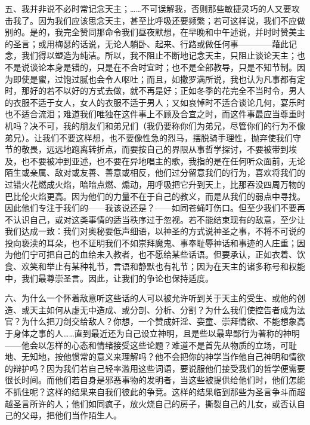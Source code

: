 五、我并非说不必时常记念天主；……不可误解我，否则那些敏捷灵巧的人又要攻击我了。因为我们应该思念天主，甚至比呼吸还要频繁；若可这样说，我们不应做别的。是的，我完全赞同那命令我们昼夜默想，在早晚和中午述说，并时时赞美主的圣言；或用梅瑟的话说，无论人躺卧、起来、行路或做任何事————藉此记念，我们得以塑造为纯洁。所以，我不阻止不断地记念天主，只阻止谈论天主；也不是说谈论本身是错的，只是在不合时宜时；也不是全部教导，只是不知节制。因为即使是蜜，过饱过腻也会令人呕吐；而且，如撒罗满所说，我也认为凡事都有定时，那好的若不以好的方式去做，就不再是好；正如冬季的花完全不当时令，男人的衣服不适于女人，女人的衣服不适于男人；又如哀悼时不适合谈论几何，宴乐时也不适合流泪；难道我们唯独在这件事上不顾及合宜之时，而这件事最应当尊重时机吗？决不可，我的朋友们和弟兄们（我仍要称你们为弟兄，尽管你们的行为不像弟兄）。让我们不要这样想，也不要像性急的烈马，摆脱骑手理性，抛弃使我们守节的敬畏，远远地跑离转折点，而要按自己的界限从事哲学探讨，不要被带到埃及，也不要被冲到亚述，也不要在异地唱主的歌，我指的是在任何听众面前，无论陌生或亲属、敌对或友善、善意或相反，他们过分留意我们的行为，喜欢将我们的过错火花燃成火焰，暗暗点燃、煽动，用呼吸把它升到天上，比那吞没四周万物的巴比伦火焰更高。因为他们的力量不在于自己的教义，而是从我们的弱点中寻找。因此他们专注于我们的——我该说还是？——如同苍蝇叮伤口。但至少我们不要再不认识自己，或对这类事情的适当秩序过于忽视。若不能结束现有的敌意，至少让我们达成一致：我们对奥秘要低声细语，以神圣的方式说神圣之事，不将不可说的投向亵渎的耳朵，也不证明我们不如崇拜魔鬼、事奉耻辱神话和事迹的人庄重；因为他们宁可把自己的血给未入教者，也不愿给某些话语。但要承认，正如衣着、饮食、欢笑和举止有某种礼节，言语和静默也有礼节；因为在天主的诸多称号和权能中，我们最尊崇圣言。因此，让我们的争论也保持适度。\par

六、为什么一个怀着敌意听这些话的人可以被允许听到关于天主的受生、或他的创造、或天主如何从虚无中造成、或分剖、分析、分割？为什么我们使控告者成为法官？为什么把刀剑交给敌人？你想，一个赞成奸淫、娈童、崇拜情欲、不能想象高于身体之事的人……直到最近还为自己设立神明，且是些以最卑鄙行为著称的神明——他会以怎样的心态和情绪接受这些论题？难道不是首先从物质的立场，可耻地、无知地，按他惯常的意义来理解吗？他不会把你的神学当作他自己神明和情欲的辩护吗？因为我们若自己轻率滥用这些词语，要说服他们接受我们的哲学便需要很长时间。而他们若自身是邪恶事物的发明者，当这些被提供给他们时，他们怎能不抓住呢？这样的结果来自我们彼此的争竞。这样的结果临到那些为圣言争斗而超越圣言所许的人；他们如同疯子，放火烧自己的房子，撕裂自己的儿女，或否认自己的父母，把他们当作陌生人。\par

